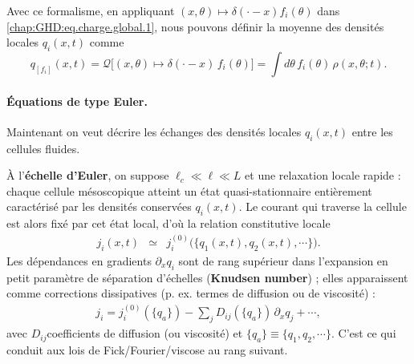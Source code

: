 Avec ce formalisme, en appliquant $(x,\theta) \mapsto \delta(\cdot - x)f_i(\theta)$ dans \eqref{chap:GHD:eq.charge.global.1}, nous pouvons définir la moyenne des densités locales $q_i(x,t)$  comme
\begin{equation}\label{chap:GHD:eq.chochet.bonnemain.4.11}
	q_{[f_i]}(x,t) = \mathcal{Q} \big[ (x,\theta) \mapsto \delta(\cdot - x) \, f_i(\theta) \big] =\int d\theta\, f_i(\theta)\,\rho(x,\theta;t).
\end{equation}






\paragraph*{Équations de type Euler.}  
Maintenant on veut décrire les échanges des densités locales $q_i(x,t)$ entre les cellules fluides.

\smallskip

À l'{\bf échelle d'Euler}, on suppose $\ell_c\ll\ell\ll L$ et une relaxation locale rapide : chaque cellule mésoscopique atteint un état quasi-stationnaire entièrement caractérisé par les densités conservées $q_i(x,t)$. Le courant qui traverse la cellule est alors fixé par cet état local, d'où la relation constitutive locale
\begin{eqnarray}
	j_i(x,t) & \simeq &j_i^{(0)}\big(\{q_1(x,t),q_2(x,t),\cdots \}\big).
\end{eqnarray}
Les dépendances en gradients $\partial_x q_i$ sont de rang supérieur dans l'expansion en petit paramètre de séparation d'échelles ({\bf Knudsen number}) ; elles apparaissent comme corrections dissipatives (p. ex. termes de diffusion ou de viscosité) :
\begin{eqnarray}
j_i = j_i^{(0)}(\{q_a\}) - \sum_j D_{ij}(\{q_a\})\,\partial_x q_j +  \cdots ,
\end{eqnarray}
avec $D_{ij}$coefficients de diffusion (ou viscosité) et $\{q_a\} \equiv \{q_1 , q_2 ,  \cdots \}$. C’est ce qui conduit aux lois de Fick/Fourier/viscose au rang suivant.

